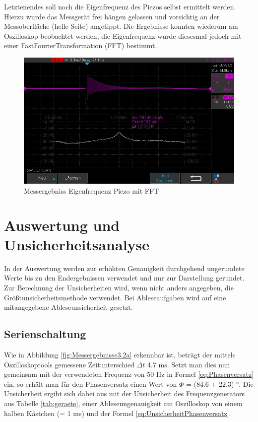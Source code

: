 \documentclass[12pt,a4paper,twoside]{article}
\begin{document}
\noindent
Letztenendes soll noch die Eigenfrequenz des Piezos selbst ermittelt werden. Hierzu wurde das Messgerät frei hängen gelassen und vorsichtig an der Messoberfläche (helle Seite) angetippt.
Die Ergebnisse konnten wiederum am Oszilloskop beobachtet werden, die Eigenfrequenz wurde diesesmal jedoch mit einer FastFourierTransformation (FFT) bestimmt.

\begin{figure}[H]
    \centering
    \includegraphics[width=0.6\linewidth, angle=0]{Messergebnisse/3.4 EigenfrequenzDing/DSO00001.jpg}
    \caption{Messergebniss Eigenfrequenz Piezo mit FFT}
    \label{fig:MessergebnissEigenfrequenzPiezo}
\end{figure}


\section{Auswertung und Unsicherheitsanalyse} %

In der Auswertung werden zur erhöhten Genauigkeit durchgehend ungerundete Werte bis zu den Endergebnissen verwendet und nur zur Darstellung gerundet. \\
Zur Berechnung der Unsicherheiten wird, wenn nicht anders angegeben, die Größtunsicherheitsmethode verwendet. Bei Ableseaufgaben wird auf eine mitangegebene Ableseunsicherheit gesetzt.

\subsection{Serienschaltung}

Wie in Abbildung \ref{fig:Messergebnisse3.2a} erkennbar ist, beträgt der mittels Oszilloskoptools gemessene Zeitunterschied $\Delta t$ 4.7 ms. Setzt man dies nun gemeinsam mit der verwendeten Frequenz von 50 Hz in Formel \ref{eq:Phasenversatz} ein, so erhält man für den Phasenversatz einen Wert von $\Phi$ = (84.6 $\pm$ 22.3) °. 
Die Unsicherheit ergibt sich dabei aus mit der Unsicherheit des Frequenzgenerators aus Tabelle \ref{tab:geraete}, einer Ableseungenauigkeit am Oszilloskop von einem halben Kästchen (= 1 ms) und der Formel \ref{eq:UnsicherheitPhasenversatz}. \newline
\end{document}

